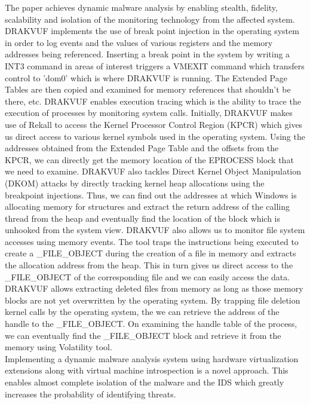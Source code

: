 \documentclass[16pt]{article}
\begin{document}
		The paper achieves dynamic malware analysis by enabling stealth, fidelity, scalability and isolation of the monitoring technology from the affected system. DRAKVUF implements the use of break point injection in the operating system in order to log events and the values of various registers and the memory addresses being referenced. Inserting a break point in the system by writing a INT3 command in areas of interest triggers a VMEXIT command which transfers control to 'dom0' which is where DRAKVUF is running. The Extended Page Tables are then copied and examined for memory references that shouldn't be there, etc. DRAKVUF enables execution tracing which is the ability to trace the execution of processes by monitoring system calls. Initially, DRAKVUF makes use of Rekall to access the Kernel Processor Control Region (KPCR) which gives us direct access to various kernel symbols used in the operating system. Using the addresses obtained from the Extended Page Table and the offsets from the KPCR, we can directly get the memory location of the EPROCESS block that we need to examine. DRAKVUF also tackles Direct Kernel Object Manipulation (DKOM) attacks by directly tracking kernel heap allocations using the breakpoint injections. Thus, we can find out the addresses at which Windows is allocating memory for structures and extract the return address of the calling thread from the heap and eventually find the location of the block which is unhooked from the system view. DRAKVUF also allows us to monitor file system accesses using memory events. The tool traps the instructions being executed to create a \_FILE\_OBJECT during the creation of a file in memory and extracts the allocation address from the heap. This in turn gives us direct access to the \_FILE\_OBJECT of the corresponding file and we can easily access the data. DRAKVUF allows extracting deleted files from memory as long as those memory blocks are not yet overwritten by the operating system. By trapping file deletion kernel calls by the operating system, the we can retrieve the address of the handle to the \_FILE\_OBJECT. On examining the handle table of the process, we can eventually find the \_FILE\_OBJECT block and retrieve it from the memory using Volatility tool.\\
		Implementing a dynamic malware analysis system using hardware virtualization extensions along with virtual machine introspection is a novel approach. This enables almost complete isolation of the malware and the IDS which greatly increases the probability of identifying threats.
		
\end{document}
